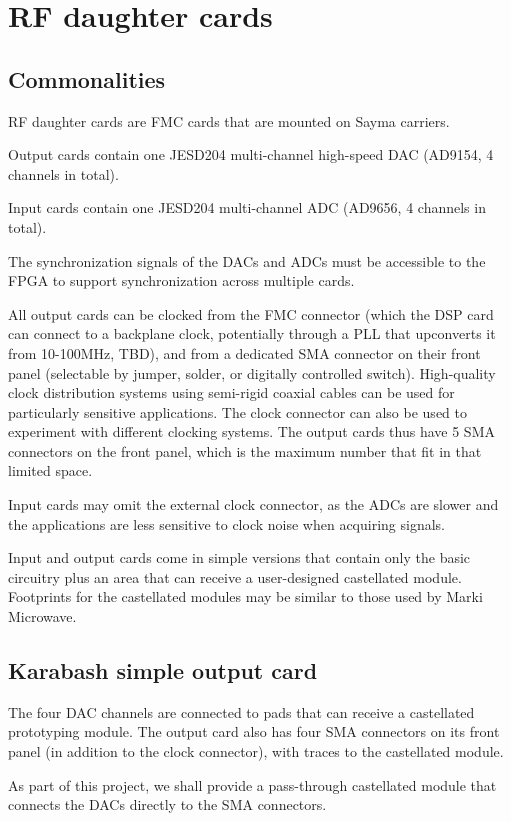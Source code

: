 \documentclass[11pt]{paper}
\begin{document}
\section{RF daughter cards}
\subsection{Commonalities}
RF daughter cards are FMC cards that are mounted on Sayma carriers.

Output cards contain one JESD204 multi-channel high-speed DAC (AD9154, 4 channels in total).

Input cards contain one JESD204 multi-channel ADC (AD9656, 4 channels in total).

The synchronization signals of the DACs and ADCs must be accessible to the FPGA to support synchronization across multiple cards.

All output cards can be clocked from the FMC connector (which the DSP card can connect to a backplane clock, potentially through a PLL that upconverts it from 10-100MHz, TBD), and from a dedicated SMA connector on their front panel (selectable by jumper, solder, or digitally controlled switch). High-quality clock distribution systems using semi-rigid coaxial cables can be used for particularly sensitive applications. The clock connector can also be used to experiment with different clocking systems. The output cards thus have 5 SMA connectors on the front panel, which is the maximum number that fit in that limited space.

Input cards may omit the external clock connector, as the ADCs are slower and the applications are less sensitive to clock noise when acquiring signals.

Input and output cards come in simple versions that contain only the basic circuitry plus an area that can receive a user-designed castellated module. Footprints for the castellated modules may be similar to those used by Marki Microwave.

\subsection{Karabash simple output card}
The four DAC channels are connected to pads that can receive a castellated prototyping module. The output card also has four SMA connectors on its front panel (in addition to the clock connector), with traces to the castellated module.

As part of this project, we shall provide a pass-through castellated module that connects the DACs directly to the SMA connectors.
\end{document}

